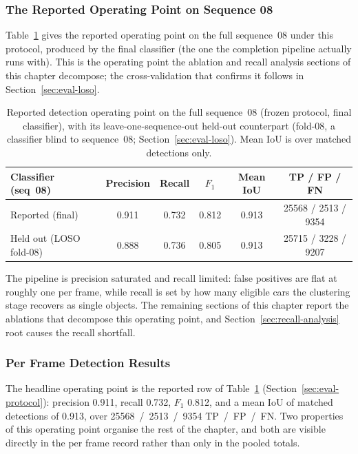 \documentclass[a4paper,12pt]{report}
\begin{document}
\subsubsection{The Reported Operating Point on Sequence 08}
\label{sec:eval-operating-point}

Table~\ref{tab:headline} gives the reported operating point on the full
sequence~08 under this protocol, produced by the final classifier (the one the
completion pipeline actually runs with). This is the operating point the
ablation and recall analysis sections of this chapter decompose; the
cross-validation that confirms it follows in Section~\ref{sec:eval-loso}.

\begin{table}[H]
  \centering
  \caption[Reported detection operating point]{Reported detection operating point on the
    full sequence~08 (frozen protocol, final classifier), with its leave-one-sequence-out
    held-out counterpart (fold-08, a classifier blind to sequence~08;
    Section~\ref{sec:eval-loso}). Mean IoU is over matched detections only.}
  \label{tab:headline}
  \setlength{\tabcolsep}{5pt}
  \begin{tabular}{lccccc}
    \toprule
    Classifier (seq~08) & Precision & Recall & $F_1$ & Mean IoU & TP / FP / FN \\
    \midrule
    Reported (final)        & 0.911 & 0.732 & 0.812 & 0.913 & \num{25568} / \num{2513} / \num{9354} \\
    Held out (LOSO fold-08) & 0.888 & 0.736 & 0.805 & 0.913 & \num{25715} / \num{3228} / \num{9207} \\
    \bottomrule
  \end{tabular}
\end{table}

The pipeline is precision saturated and recall limited: false positives are flat
at roughly one per frame, while recall is set by how many eligible cars the
clustering stage recovers as single objects. The remaining sections of this
chapter report the ablations that decompose this operating point, and Section~\ref{sec:recall-analysis}
root causes the recall shortfall.

\subsubsection{Per Frame Detection Results}

The headline operating point is the reported row of Table~\ref{tab:headline}
(Section~\ref{sec:eval-protocol}): precision \num{0.911}, recall \num{0.732}, $F_1$ \num{0.812}, and
a mean IoU of matched detections of \num{0.913}, over
\num{25568}~/~\num{2513}~/~\num{9354} TP~/~FP~/~FN. Two properties of this
operating point organise the rest of the chapter, and both are visible directly
in the per frame record rather than only in the pooled totals.
\end{document}
